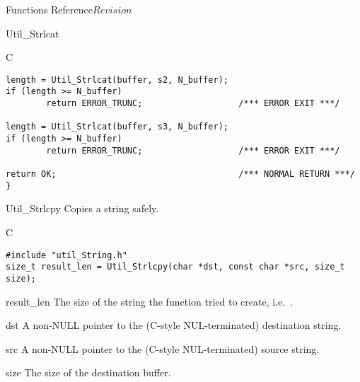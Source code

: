 \begin{cactuspart}{ Functions Reference}{}{$Revision$}
\begin{FunctionDescription}{Util\_Strlcat}
\begin{ExampleSection}
\begin{Example}{C}
\begin{verbatim}
length = Util_Strlcat(buffer, s2, N_buffer);
if (length >= N_buffer)
        return ERROR_TRUNC;                   /*** ERROR EXIT ***/

length = Util_Strlcat(buffer, s3, N_buffer);
if (length >= N_buffer)
        return ERROR_TRUNC;                   /*** ERROR EXIT ***/

return OK;                                    /*** NORMAL RETURN ***/
}
\end{verbatim}
\end{Example}
\end{ExampleSection}
\end{FunctionDescription}


\begin{FunctionDescription}{Util\_Strlcpy}
\label{Util-Strlcpy}
Copies a string safely.

\begin{SynopsisSection}
\begin{Synopsis}{C}
\begin{verbatim}
#include "util_String.h"
size_t result_len = Util_Strlcpy(char *dst, const char *src, size_t size);
\end{verbatim}
\end{Synopsis}
\end{SynopsisSection}

\begin{ResultSection}
\begin{Result}{result\_len}
The size of the string the function tried to create, i.e.\
.
\end{Result}
\end{ResultSection}

\begin{ParameterSection}
\begin{Parameter}{dst}
A non-NULL pointer to the (C-style NUL-terminated) destination string.
\end{Parameter}
\begin{Parameter}{src}
A non-NULL pointer to the (C-style NUL-terminated) source string.
\end{Parameter}
\begin{Parameter}{size}
The size of the destination buffer.
\end{Parameter}
\end{ParameterSection}


\end{FunctionDescription}
\end{cactuspart}
